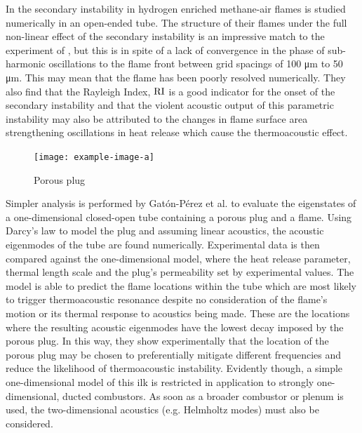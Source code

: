 In \cite{jun2023ParametricInstabilityPropagating} the secondary instability in hydrogen enriched methane-air flames is studied numerically in an open-ended tube. The structure of their flames under the full non-linear effect of the secondary instability is an impressive match to the experiment of \cite{ebieto2017DynamicsPremixedFlames}, but this is in spite of a lack of convergence in the phase of sub-harmonic oscillations to the flame front between grid spacings of 100 μm to 50 μm. This may mean that the flame has been poorly resolved numerically. They also find that the Rayleigh Index, $\rm{RI}$ is a good indicator for the onset of the secondary instability and that the violent acoustic output of this parametric instability may also be attributed to the changes in flame surface area strengthening oscillations in heat release which cause the thermoacoustic effect.


\begin{figure}[t]
\centering
\texttt{[image: example-image-a]}
\caption{Porous plug}
\label{fig:porous-plug}
\end{figure}

Simpler analysis is performed by Gatón-Pérez et al. \cite{gaton-perez2025MitigationThermoacousticInstabilities} to evaluate the eigenstates of a one-dimensional closed-open tube containing a porous plug and a flame. Using Darcy's law to model the plug and assuming linear acoustics, the acoustic eigenmodes of the tube are found numerically. Experimental data is then compared against the one-dimensional model, where the heat release parameter, thermal length scale and the plug's permeability set by experimental values. The model is able to predict the flame locations within the tube which are most likely to trigger thermoacoustic resonance despite no consideration of the flame's motion or its thermal response to acoustics being made. These are the locations where the resulting acoustic eigenmodes have the lowest decay imposed by the porous plug. In this way, they show experimentally that the location of the porous plug may be chosen to preferentially mitigate different frequencies and reduce the likelihood of thermoacoustic instability. Evidently though, a simple one-dimensional model of this ilk is restricted in application to strongly one-dimensional, ducted combustors. As soon as a broader combustor or plenum is used, the two-dimensional acoustics (e.g. Helmholtz modes) must also be considered.






